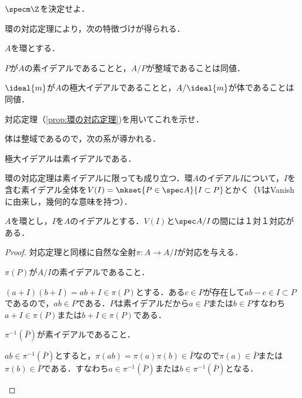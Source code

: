 \begin{exer}
	$\specm \Z$を決定せよ．
\end{exer}

環の対応定理により，次の特徴づけが得られる．

\begin{prop}
	$A$を環とする．
	\begin{sakura}
		\item $P$が$A$の素イデアルであることと，$A/P$が整域であることは同値．
		\item $\ideal{m}$が$A$の極大イデアルであることと，$A/\ideal{m}$が体であることは同値．
	\end{sakura}
\end{prop}

\begin{exer}
	対応定理（\ref{prop:環の対応定理})を用いてこれを示せ．
\end{exer}

体は整域であるので，次の系が導かれる．

\begin{cor}
	極大イデアルは素イデアルである．
\end{cor}

環の対応定理は素イデアルに限っても成り立つ．環$A$のイデアル$I$について，$I$を含む素イデアル全体を$V(I)=\mkset{P\in\spec A}{I\subset P}$とかく（$V$はVanishに由来し，幾何的な意味を持つ）．

\begin{prop}[素イデアルの対応定理]
	$A$を環とし，$I$を$A$のイデアルとする．$V(I)$と$\spec A/I$の間には１対１対応がある．
\end{prop}
\begin{proof}
	対応定理と同様に自然な全射$\pi:A\to A/I$が対応を与える．
	\begin{step}
		\item $\pi(P)$が$A/I$の素イデアルであること．
		
		 $(a+I)(b+I)=ab+I\in\pi(P)$とする．ある$c\in P$が存在して$ab-c\in I\subset P$であるので，$ab\in P$である．$P$は素イデアルだから$a\in P$または$b\in P$すなわち$a+I\in\pi(P)$または$b+I\in\pi(P)$である．
		
		\item $\pi^{-1}(\bar{P})$が素イデアルであること．
		
		$ab\in\pi^{-1}(\bar{P})$とすると，$\pi(ab)=\pi(a)\pi(b)\in\bar{P}$なので$\pi(a)\in\bar{P}$または$\pi(b)\in\bar{P}$である．すなわち$a\in\pi^{-1}(\bar{P})$または$b\in\pi^{-1}(\bar{P})$となる．
	\end{step}
\end{proof}

